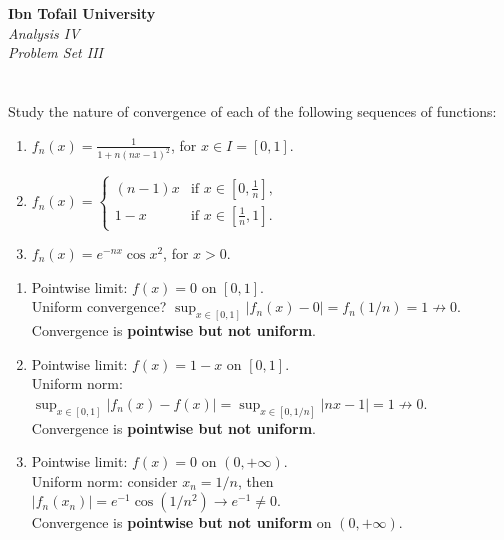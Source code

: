 \documentclass[12pt]{article}
\begin{document}
\begin{center}
\Large\textbf{Ibn Tofail University} \\[1em]
\large\textit{Analysis IV} \\[2em]
\large\textit{Problem Set III} \\[0.5em]
\end{center}

\vspace{1cm}

\section{}
Study the nature of convergence of each of the following sequences of functions:

\begin{enumerate}
    \item $f_n(x) = \frac{1}{1+n(nx-1)^2}$, for $x \in I = [0, 1]$.
    \item $f_n(x) = \begin{cases}
            (n-1)x & \text{if } x \in \left[0, \frac{1}{n}\right], \\
            1-x & \text{if } x \in \left[\frac{1}{n}, 1\right].
        \end{cases}$
    \item $f_n(x) = e^{-nx}\cos x^2$, for $x > 0$.
\end{enumerate}

\begin{correctionbox}
\begin{enumerate}
    \item 
    Pointwise limit: $f(x)=0$ on $[0,1]$. \\
    Uniform convergence? $\sup_{x\in[0,1]}|f_n(x)-0| = f_n(1/n)=1 \not\to 0$. \\
    Convergence is \textbf{pointwise but not uniform}.

    \item 
    Pointwise limit: $f(x)=1-x$ on $[0,1]$. \\
    Uniform norm: $\sup_{x\in[0,1]}|f_n(x)-f(x)| = \sup_{x\in[0,1/n]}|nx-1| = 1 \not\to 0$. \\
    Convergence is \textbf{pointwise but not uniform}.

    \item 
    Pointwise limit: $f(x)=0$ on $(0,+\infty)$. \\
    Uniform norm: consider $x_n=1/n$, then $|f_n(x_n)|=e^{-1}\cos(1/n^2)\to e^{-1}\neq0$. \\
    Convergence is \textbf{pointwise but not uniform} on $(0,+\infty)$.
\end{enumerate}
\end{correctionbox}
\end{document}
